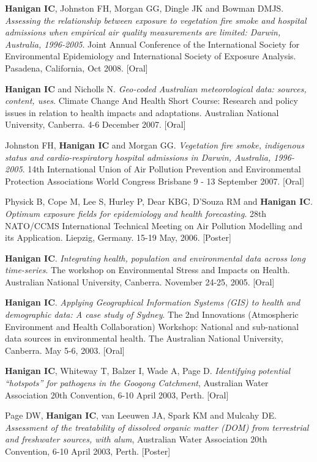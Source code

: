 \documentclass[a4paper,11pt]{article}
\begin{document}
\begin{revnumerate}
\item \textbf{Hanigan IC}, Johnston FH, Morgan GG, Dingle JK and Bowman DMJS. \emph{Assessing the relationship between exposure to vegetation fire smoke and hospital admissions when empirical air quality measurements are limited: Darwin, Australia, 1996-2005}. Joint Annual Conference of the International Society for Environmental Epidemiology and International Society of Exposure Analysis. Pasadena, California, Oct 2008. [Oral]

\item \textbf{Hanigan IC} and Nicholls N. \emph{Geo-coded Australian meteorological data: sources, content, uses}. Climate Change And Health Short Course: Research and policy issues in relation to health impacts and adaptations.  Australian National University, Canberra. 4-6 December 2007. [Oral]

\item Johnston FH, \textbf{Hanigan IC} and Morgan GG. \emph{Vegetation fire smoke, indigenous status and cardio-respiratory hospital admissions in Darwin, Australia, 1996-2005}. 14th International Union of Air Pollution Prevention and Environmental Protection Associations World Congress Brisbane 9 - 13 September 2007. [Oral]

\item Physick B, Cope M, Lee S, Hurley P, Dear KBG, D’Souza RM and \textbf{Hanigan IC}. \emph{Optimum exposure fields for epidemiology and health forecasting}. 28th NATO/CCMS International Technical Meeting on Air Pollution Modelling and its Application. Liepzig, Germany. 15-19 May, 2006. [Poster]

\item \textbf{Hanigan IC}. \emph{Integrating health, population and environmental data across long time-series}. The workshop on Environmental Stress and Impacts on Health. Australian National University, Canberra. November 24-25, 2005. [Oral]

\item \textbf{Hanigan IC}. \emph{Applying Geographical Information Systems (GIS) to health and demographic data: A case study of Sydney}. The 2nd Innovations (Atmospheric Environment and Health Collaboration) Workshop: National and sub-national data sources in environmental health. The Australian National University, Canberra. May 5-6, 2003. [Oral]

\item \textbf{Hanigan IC}, Whiteway T, Balzer I, Wade A, Page D. \emph{Identifying potential “hotspots” for pathogens in the Googong Catchment}, Australian Water Association 20th Convention, 6-10 April 2003, Perth. [Oral]

\item Page DW, \textbf{Hanigan IC}, van Leeuwen JA, Spark KM and Mulcahy DE.  \emph{Assessment of the treatability of dissolved organic matter (DOM) from terrestrial and freshwater sources, with alum}, Australian Water Association 20th Convention, 6-10 April 2003, Perth. [Poster]


\end{revnumerate}
\end{document}
